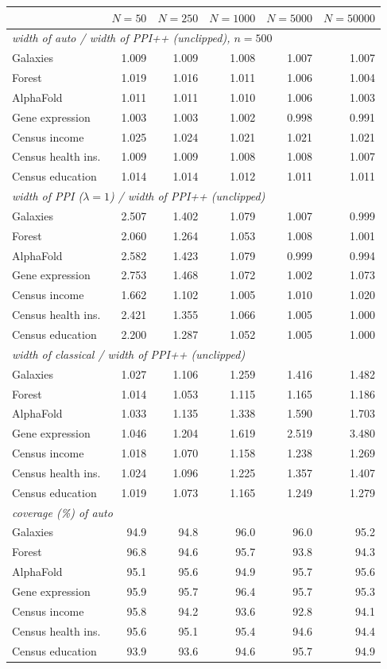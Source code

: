 \begin{tabular}{lrrrrr}
\toprule
 & $N{=}50$ & $N{=}250$ & $N{=}1000$ & $N{=}5000$ & $N{=}50000$\\
\midrule
\multicolumn{6}{l}{\emph{width of auto / width of PPI++ (unclipped), $n=500$}}\\
Galaxies & 1.009 & 1.009 & 1.008 & 1.007 & 1.007\\
Forest & 1.019 & 1.016 & 1.011 & 1.006 & 1.004\\
AlphaFold & 1.011 & 1.011 & 1.010 & 1.006 & 1.003\\
Gene expression & 1.003 & 1.003 & 1.002 & 0.998 & 0.991\\
Census income & 1.025 & 1.024 & 1.021 & 1.021 & 1.021\\
Census health ins. & 1.009 & 1.009 & 1.008 & 1.008 & 1.007\\
Census education & 1.014 & 1.014 & 1.012 & 1.011 & 1.011\\
\midrule
\multicolumn{6}{l}{\emph{width of PPI ($\lambda{=}1$) / width of PPI++ (unclipped)}}\\
Galaxies & 2.507 & 1.402 & 1.079 & 1.007 & 0.999\\
Forest & 2.060 & 1.264 & 1.053 & 1.008 & 1.001\\
AlphaFold & 2.582 & 1.423 & 1.079 & 0.999 & 0.994\\
Gene expression & 2.753 & 1.468 & 1.072 & 1.002 & 1.073\\
Census income & 1.662 & 1.102 & 1.005 & 1.010 & 1.020\\
Census health ins. & 2.421 & 1.355 & 1.066 & 1.005 & 1.000\\
Census education & 2.200 & 1.287 & 1.052 & 1.005 & 1.000\\
\midrule
\multicolumn{6}{l}{\emph{width of classical / width of PPI++ (unclipped)}}\\
Galaxies & 1.027 & 1.106 & 1.259 & 1.416 & 1.482\\
Forest & 1.014 & 1.053 & 1.115 & 1.165 & 1.186\\
AlphaFold & 1.033 & 1.135 & 1.338 & 1.590 & 1.703\\
Gene expression & 1.046 & 1.204 & 1.619 & 2.519 & 3.480\\
Census income & 1.018 & 1.070 & 1.158 & 1.238 & 1.269\\
Census health ins. & 1.024 & 1.096 & 1.225 & 1.357 & 1.407\\
Census education & 1.019 & 1.073 & 1.165 & 1.249 & 1.279\\
\midrule
\multicolumn{6}{l}{\emph{coverage (\%) of auto}}\\
Galaxies & 94.9 & 94.8 & 96.0 & 96.0 & 95.2\\
Forest & 96.8 & 94.6 & 95.7 & 93.8 & 94.3\\
AlphaFold & 95.1 & 95.6 & 94.9 & 95.7 & 95.6\\
Gene expression & 95.9 & 95.7 & 96.4 & 95.7 & 95.3\\
Census income & 95.8 & 94.2 & 93.6 & 92.8 & 94.1\\
Census health ins. & 95.6 & 95.1 & 95.4 & 94.6 & 94.4\\
Census education & 93.9 & 93.6 & 94.6 & 95.7 & 94.9\\
\bottomrule
\end{tabular}